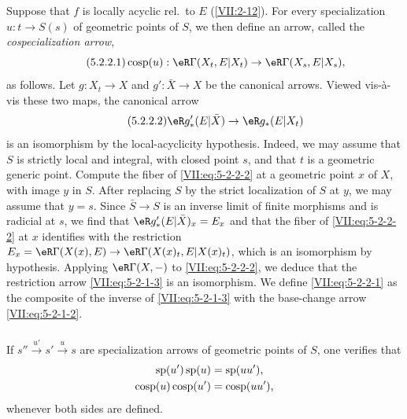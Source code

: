 \subsubsection{}\label{VII:5-2-2}

Suppose that $f$ is locally acyclic rel.\ to $E$ (\ref{VII:2-12}). For
every specialization $u:t\to S(s)$ of geometric points of $S$, we then define
an arrow, called the \emph{cospecialization arrow},
\begin{equation*}\tag{5.2.2.1}\label{VII:eq:5-2-2-1}
  \cosp(u):\eR\Gamma(X_t,E|X_t) \to \eR\Gamma(X_s,E|X_s) \text{,} 
\end{equation*}
as follows. Let $g:X_t\to X$ and $g':\bar X\to X$ be the canonical arrows.
Viewed vis-\`a-vis these two maps, the canonical arrow
\begin{equation*}\tag{5.2.2.2}\label{VII:eq:5-2-2-2}
  \eR g'_\ast(E|\bar X)\to \eR g_\ast(E|X_t) 
\end{equation*}
is an isomorphism by the local-acyclicity hypothesis. Indeed, we may assume
that $S$ is strictly local and integral, with closed point $s$, and that $t$
is a geometric generic point. Compute the fiber of
\eqref{VII:eq:5-2-2-2} at a geometric point $x$ of $X$, with image $y$ in
$S$. After replacing $S$ by the strict localization of $S$ at $y$, we may
assume that $y=s$. Since $\bar S\to S$ is an inverse limit of finite
morphisms and is radicial at $s$, we find that
$\eR g'_\ast(E|\bar X)_x = E_x$ and that the fiber of
\eqref{VII:eq:5-2-2-2} at $x$ identifies with the restriction
$E_x=\eR\Gamma(X(x),E)\to \eR\Gamma(X(x)_t,E|X(x)_t)$, which is an
isomorphism by hypothesis. Applying $\eR\Gamma(X,-)$ to
\eqref{VII:eq:5-2-2-2}, we deduce that the restriction arrow
\eqref{VII:eq:5-2-1-3} is an isomorphism. We define
\eqref{VII:eq:5-2-2-1} as the composite of the inverse of
\eqref{VII:eq:5-2-1-3} with the base-change arrow
\eqref{VII:eq:5-2-1-2}.






\subsubsection{}\label{VII:5-2-3}

If $s'' \xrightarrow{u'} s' \xrightarrow u s$ are specialization arrows of
geometric points of $S$, one verifies that
\begin{align*}
  \operatorname{sp}(u')\operatorname{sp}(u) &= \operatorname{sp}(u u') \text{,} \\
  \operatorname{cosp}(u) \operatorname{cosp}(u') &= \operatorname{cosp}(u u') \text{,} 
\end{align*}
whenever both sides are defined.







